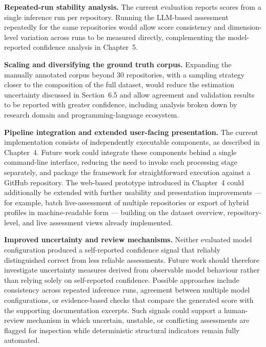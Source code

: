 \textbf{Repeated-run stability analysis.} The current evaluation
reports scores from a single inference run per repository. Running
the LLM-based assessment repeatedly for the same repositories would
allow score consistency and dimension-level variation across runs to
be measured directly, complementing the model-reported confidence
analysis in Chapter~5.

\textbf{Scaling and diversifying the ground truth corpus.} Expanding
the manually annotated corpus beyond 30 repositories, with a
sampling strategy closer to the composition of the full dataset,
would reduce the estimation uncertainty discussed in Section~6.5 and
allow agreement and validation results to be reported with greater
confidence, including analysis broken down by research domain and
programming-language ecosystem.

\textbf{Pipeline integration and extended user-facing presentation.}
The current implementation consists of independently executable
components, as described in Chapter~4. Future work could integrate
these components behind a single command-line interface, reducing
the need to invoke each processing stage separately, and package the
framework for straightforward execution against a GitHub repository.
The web-based prototype introduced in Chapter~4 could additionally be
extended with further usability and presentation improvements ---
for example, batch live-assessment of multiple repositories or
export of hybrid profiles in machine-readable form --- building on
the dataset overview, repository-level, and live assessment views
already implemented.

\textbf{Improved uncertainty and review mechanisms.}
Neither evaluated model configuration produced a self-reported
confidence signal that reliably distinguished correct from less
reliable assessments. Future work should therefore investigate
uncertainty measures derived from observable model behaviour rather
than relying solely on self-reported confidence. Possible approaches
include consistency across repeated inference runs, agreement between
multiple model configurations, or evidence-based checks that compare
the generated score with the supporting documentation excerpts.
Such signals could support a human-review mechanism in which
uncertain, unstable, or conflicting assessments are flagged for
inspection while deterministic structural indicators remain fully
automated.